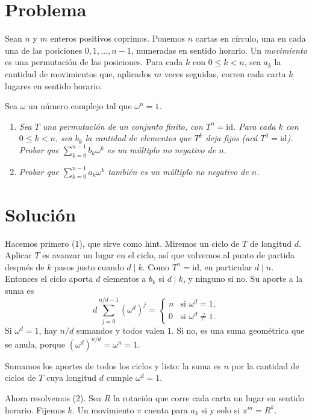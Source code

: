 \documentclass[11pt]{amsproc}
\newcommand{\id}{\mathrm{id}}
\begin{document}
\section*{Problema}

Sean $n$ y $m$ enteros positivos coprimos. Ponemos $n$ cartas en círculo,
una en cada una de las posiciones $0,1,\dots,n-1$, numeradas en sentido
horario. Un \emph{movimiento} es una permutación de las posiciones. Para cada
$k$ con $0\le k<n$, sea $a_k$ la cantidad de movimientos que, aplicados $m$
veces seguidas, corren cada carta $k$ lugares en sentido horario.

Sea $\omega$ un número complejo tal que $\omega^n=1$.

\begin{enumerate}
  \item\itshape Sea $T$ una permutación de un conjunto finito, con $T^n=\id$.
        Para cada $k$ con $0\le k<n$, sea $b_k$ la cantidad de elementos que
        $T^k$ deja fijos (acá $T^0=\id$). Probar que
        $\sum_{k=0}^{n-1}b_k\omega^k$ es un múltiplo no negativo de $n$.
  \item\itshape Probar que $\sum_{k=0}^{n-1}a_k\omega^k$ también es un
        múltiplo no negativo de $n$.
\end{enumerate}

\section*{Solución}

Hacemos primero (1), que sirve como hint. 
Miremos un ciclo de $T$ de longitud $d$. Aplicar $T$ es avanzar un lugar en el
ciclo, así que volvemos al punto de partida después de $k$ pasos justo cuando
$d\mid k$. Como $T^n=\id$, en particular $d\mid n$. Entonces el ciclo aporta
$d$ elementos a $b_k$ si $d\mid k$, y ninguno si no. Su aporte a la suma es
\[
  d\sum_{j=0}^{n/d-1}(\omega^d)^j
  =
  \begin{cases}
    n & \text{si } \omega^d=1,\\
    0 & \text{si } \omega^d\ne 1.
  \end{cases}
\]
Si $\omega^d=1$, hay $n/d$ sumandos y todos valen $1$. Si no, es una suma
geométrica que se anula, porque $(\omega^d)^{n/d}=\omega^n=1$.

Sumamos los aportes de todos los ciclos y listo: la suma es $n$ por la
cantidad de ciclos de $T$ cuya longitud $d$ cumple $\omega^d=1$.

Ahora resolvemos (2). 
Sea $R$ la rotación que corre cada carta un lugar en sentido horario. Fijemos
$k$. Un movimiento $\pi$ cuenta para $a_k$ si y solo si $\pi^m=R^k$.
\end{document}

